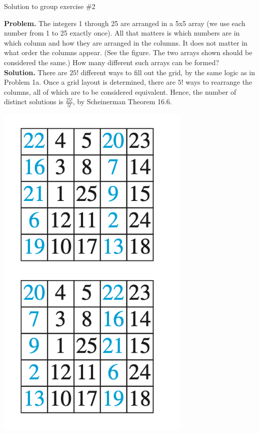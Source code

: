 \documentclass[10pt]{beamer}
\begin{document}
\begin{frame}{Solution to group exercise \#2}
\begin{minipage}{0.66\textwidth}
\textbf{Problem.} The integers 1 through 25 are arranged in a 5x5 array (we use each number from 1 to 25 exactly once). All that matters is which numbers are in which column and how they are arranged in the columns.  It does not matter in what order the columns appear. (See the figure.  The two arrays shown should be considered the same.) How many different such arrays can be formed?\\
\vfill 
\textbf{Solution.} There are $25!$ different ways to fill out the grid, by the same logic as in Problem 1a.  Once a grid layout is determined, there are $5!$ ways to rearrange the columns, all of which are to be considered equivalent. Hence, the number of distinct solutions is $\frac{25!}{5!}$, by Scheinerman Theorem 16.6.
\end{minipage}
\hfill 
\begin{minipage}{0.31\textwidth}
\includegraphics[width=0.7\textwidth]{images/partition_group_exercise.png}	
\end{minipage}
\end{frame}
\end{document}
